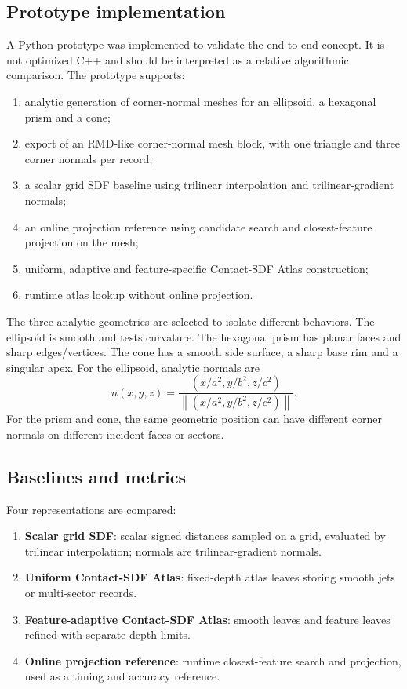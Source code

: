 \documentclass[preprint,12pt,sort&compress]{elsarticle}
\newcommand{\norm}[1]{\left\lVert #1 \right\rVert}
\begin{document}
\subsection{Prototype implementation}

A Python prototype was implemented to validate the end-to-end concept. It is not optimized C++ and should be interpreted as a relative algorithmic comparison. The prototype supports:
\begin{enumerate}[label=(\arabic*), leftmargin=1.8em]
\item analytic generation of corner-normal meshes for an ellipsoid, a hexagonal prism and a cone;
\item export of an RMD-like corner-normal mesh block, with one triangle and three corner normals per record;
\item a scalar grid SDF baseline using trilinear interpolation and trilinear-gradient normals;
\item an online projection reference using candidate search and closest-feature projection on the mesh;
\item uniform, adaptive and feature-specific Contact-SDF Atlas construction;
\item runtime atlas lookup without online projection.
\end{enumerate}

The three analytic geometries are selected to isolate different behaviors. The ellipsoid is smooth and tests curvature. The hexagonal prism has planar faces and sharp edges/vertices. The cone has a smooth side surface, a sharp base rim and a singular apex. For the ellipsoid, analytic normals are
\begin{equation}
 n(x,y,z)=\frac{(x/a^2,y/b^2,z/c^2)}{\norm{(x/a^2,y/b^2,z/c^2)}}.
\end{equation}
For the prism and cone, the same geometric position can have different corner normals on different incident faces or sectors.

\subsection{Baselines and metrics}

Four representations are compared:
\begin{enumerate}[label=(B\arabic*), leftmargin=1.8em]
\item \textbf{Scalar grid SDF}: scalar signed distances sampled on a grid, evaluated by trilinear interpolation; normals are trilinear-gradient normals.
\item \textbf{Uniform Contact-SDF Atlas}: fixed-depth atlas leaves storing smooth jets or multi-sector records.
\item \textbf{Feature-adaptive Contact-SDF Atlas}: smooth leaves and feature leaves refined with separate depth limits.
\item \textbf{Online projection reference}: runtime closest-feature search and projection, used as a timing and accuracy reference.
\end{enumerate}
\end{document}
